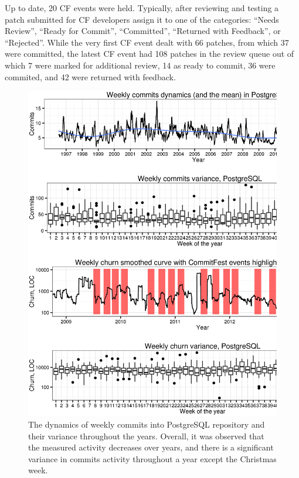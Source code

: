 Up to date, 20 CF events were held. Typically, after reviewing and testing a patch submitted for CF developers assign it to one of the categories: ``Needs Review'', ``Ready for Commit'', ``Committed'', ``Returned with Feedback'', or ``Rejected''. While the very first CF event dealt with 66 patches, from which 37 were committed, the latest CF event had 108 patches in the review queue out of which 7 were marked for additional review, 14 as ready to commit, 36 were commited, and 42 were returned with feedback.

\begin{figure}[t!]
   \centering
   \includegraphics[width=150mm]{figures/postgre_commits_dynamics.eps}
   \caption{The dynamics of weekly commits into PostgreSQL repository and their variance throughout the years. Overall, it was observed that the measured activity decreases over years, and there is a significant variance in commits activity throughout a year except the Christmas week. }
   \label{fig:postgre_dynamics}
\end{figure}

